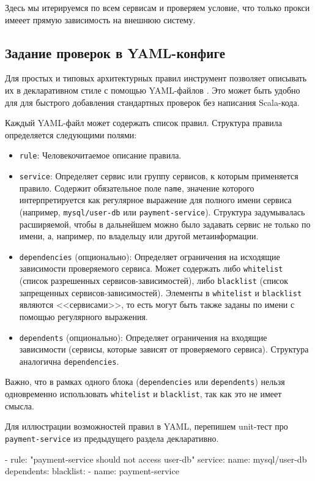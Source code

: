 Здесь мы итерируемся по всем сервисам и проверяем условие, что только прокси имееет прямую зависимость на внешнюю систему.

\subsection{Задание проверок в YAML-конфиге}

Для простых и типовых архитектурных правил инструмент позволяет описывать их в декларативном стиле с помощью YAML-файлов \cite{yaml-spec}. Это может быть удобно для для быстрого добавления стандартных проверок без написания Scala-кода.

Каждый YAML-файл может содержать список правил. Структура правила определяется следующими полями:
\begin{itemize}
    \item \verb|rule|: Человекочитаемое описание правила.
    \item \verb|service|: Определяет сервис или группу сервисов, к которым применяется правило. Содержит обязательное поле \verb|name|, значение которого интерпретируется как регулярное выражение для полного имени сервиса (например, \verb|mysql/user-db| или \verb|payment-service|). Структура задумывалась расширяемой, чтобы в дальнейшем можно было задавать сервис не только по имени, а, например, по владельцу или другой метаинформации.
    \item \verb|dependencies| (опционально): Определяет ограничения на исходящие зависимости проверяемого сервиса. Может содержать либо \verb|whitelist| (список разрешенных сервисов-зависимостей), либо \verb|blacklist| (список запрещенных сервисов-зависимостей). Элементы в \verb|whitelist| и \verb|blacklist| являются <<сервисами>>, то есть могут быть также заданы по имени с помощью регулярного выражения.
    \item \verb|dependents| (опционально): Определяет ограничения на входящие зависимости (сервисы, которые зависят от проверяемого сервиса). Структура аналогична \verb|dependencies|.
\end{itemize}

Важно, что в рамках одного блока (\verb|dependencies| или \verb|dependents|) нельзя одновременно использовать \verb|whitelist| и \verb|blacklist|, так как это не имеет смысла.

Для иллюстрации возможностей правил в YAML, перепишем unit-тест про \verb|payment-service| из предыдущего раздела декларативно.

\begin{nocode}
- rule: "payment-service should not access user-db"
  service:
    name: mysql/user-db
  dependents:
    blacklist:
      - name: payment-service
\end{nocode}

